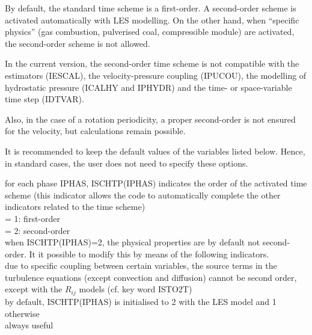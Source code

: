 By default, the standard time scheme is a first-order.
A second-order scheme is activated automatically with LES modelling.
On the other hand, when ``specific physics'' (gas combustion, pulverised coal,
compressible module) are activated, the second-order scheme is not allowed.

In the current version, the second-order time scheme is not compatible
with the estimators (IESCAL), the velocity-pressure coupling (IPUCOU),
the modelling of hydrostatic pressure (ICALHY and IPHYDR) and the time- or
space-variable time step (IDTVAR).

Also, in the case of a rotation periodicity, a proper second-order is not
ensured for the velocity, but calculations remain possible.

It is recommended to keep the default values of the variables listed
below. Hence, in standard cases, the user does not need to specify these
options.


{for each phase IPHAS, ISCHTP(IPHAS) indicates the order of the activated
time scheme (this indicator allows the code to automatically complete
the other indicators related to the time scheme)\\
\hspace*{1.3cm}= 1: first-order \\
\hspace*{1.3cm}= 2: second-order \\
when ISCHTP(IPHAS)=2, the physical properties are by default not
second-order. It it possible to modify this by means of the
following indicators.\\
due to specific coupling between certain variables, the source terms in the
turbulence equations (except convection and diffusion) cannot be second order,
except with the $R_{ij}$ models (cf. key word ISTO2T)\\
by default, ISCHTP(IPHAS) is initialised to 2 with the LES model and 1
otherwise\\
always useful}

